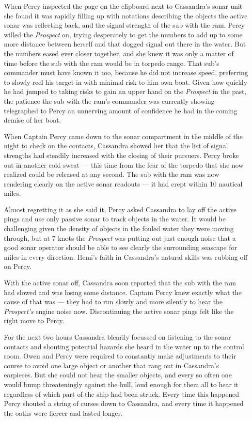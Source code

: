 \documentclass[]{scrbook}
\begin{document}
When Percy inspected the page on the clipboard next to Cassandra's sonar
unit she found it was rapidly filling up with notations describing the
objects the active sonar was reflecting back, and the signal strength of
the sub with the ram. Percy willed the \emph{Prospect} on, trying
desperately to get the numbers to add up to some more distance between
herself and that dogged signal out there in the water. But the numbers
eased ever closer together, and she knew it was only a matter of time
before the sub with the ram would be in torpedo range. That sub's
commander must have known it too, because he did not increase speed,
preferring to slowly reel his target in with minimal risk to him own
boat. Given how quickly he had jumped to taking risks to gain an upper
hand on the \emph{Prospect} in the past, the patience the sub with the
ram's commander was currently showing telegraphed to Percy an unnerving
amount of confidence he had in the coming demise of her boat.

When Captain Percy came down to the sonar compartment in the middle of
the night to check on the contacts, Cassandra showed her that the list
of signal strengths had steadily increased with the closing of their
pursuers. Percy broke out in another cold sweat --- this time from the
fear of the torpedo that she now realized could be released at any
second. The sub with the ram was now rendering clearly on the active
sonar readouts --- it had crept within 10 nautical miles.

Almost regretting it as she said it, Percy asked Cassandra to lay off
the active pings and use only passive sonar to track objects in the
water. It would be challenging given the density of objects in the
fouled water they were moving through, but at 7 knots the
\emph{Prospect} was putting out just enough noise that a good sonar
operator should be able to see clearly the surrounding seascape for
miles in every direction. Hemi's faith in Cassandra's natural skills was
rubbing off on Percy.

With the active sonar off, Cassandra soon reported that the sub with the
ram had slowed and was losing some distance. Captain Percy knew exactly
what the cause of that was --- they had to run slowly and more silently
to hear the \emph{Prospect's} engine noise now. Discontinuing the active
sonar pings felt like the right move to Percy.

For the next two hours Cassandra blearily focussed on listening to the
sonar contacts and shouting potential hazards she heard in the water up
to the control room. Owen and Percy were required to constantly make
adjustments to their course to avoid one large object or another that
rang out in Cassandra's earpieces. But she could not hear the smaller
objects, and every so often one would bump threateningly against the
hull, loud enough for them all to hear it regardless of which part of
the ship had been struck. Every time this happened Percy shouted a
string of curses down to Cassandra, and every time it happened the oaths
were fiercer and lasted longer.
\end{document}
